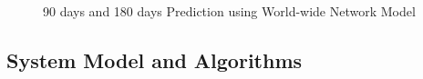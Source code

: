 \documentclass[10pt, journal,onecolumn]{IEEEtran}
\begin{document}
\begin{figure}[ht]
\centering
{}
\quad
{}
  \caption{90 days and 180 days Prediction using World-wide Network Model}
  \label{Fig:WorldPredictNetwork}
\end{figure}

\subsection{{System Model and Algorithms}}
\label{SubSec:WorldSystem}
\end{document}
